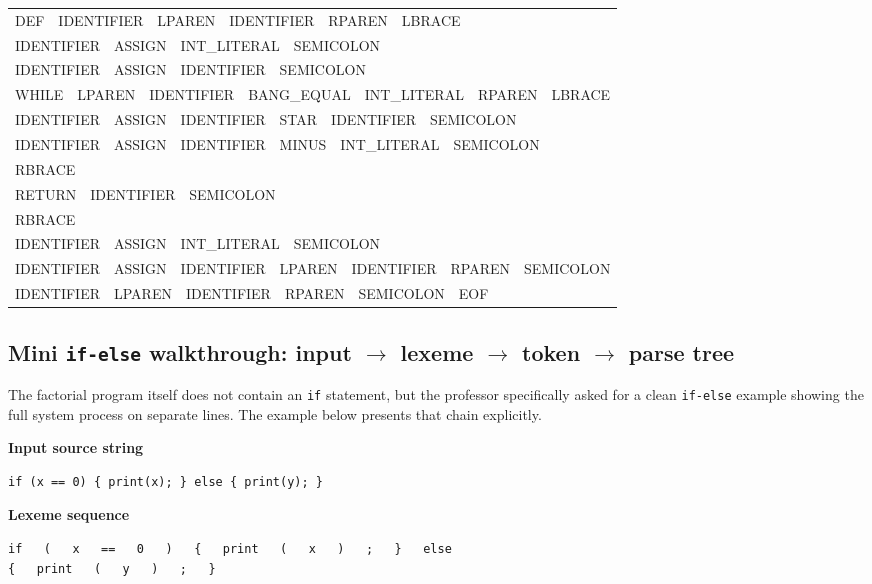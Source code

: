 \documentclass[11pt,a4paper]{article}
\begin{document}
\begin{center}
\small\ttfamily
\begin{tabular}{@{}l@{}}
  DEF\ \ IDENTIFIER\ \ LPAREN\ \ IDENTIFIER\ \ RPAREN\ \ LBRACE \\
  \quad IDENTIFIER\ \ ASSIGN\ \ INT\_LITERAL\ \ SEMICOLON \\
  \quad IDENTIFIER\ \ ASSIGN\ \ IDENTIFIER\ \ SEMICOLON \\
  \quad WHILE\ \ LPAREN\ \ IDENTIFIER\ \ BANG\_EQUAL\ \ INT\_LITERAL\ \ RPAREN\ \ LBRACE \\
  \qquad IDENTIFIER\ \ ASSIGN\ \ IDENTIFIER\ \ STAR\ \ IDENTIFIER\ \ SEMICOLON \\
  \qquad IDENTIFIER\ \ ASSIGN\ \ IDENTIFIER\ \ MINUS\ \ INT\_LITERAL\ \ SEMICOLON \\
  \quad RBRACE \\
  \quad RETURN\ \ IDENTIFIER\ \ SEMICOLON \\
  RBRACE \\
  IDENTIFIER\ \ ASSIGN\ \ INT\_LITERAL\ \ SEMICOLON \\
  IDENTIFIER\ \ ASSIGN\ \ IDENTIFIER\ \ LPAREN\ \ IDENTIFIER\ \ RPAREN\ \ SEMICOLON \\
  IDENTIFIER\ \ LPAREN\ \ IDENTIFIER\ \ RPAREN\ \ SEMICOLON\ \ EOF \\
\end{tabular}
\end{center}

\subsection*{Mini \texttt{if-else} walkthrough: input $\rightarrow$ lexeme $\rightarrow$ token $\rightarrow$ parse tree}
The factorial program itself does not contain an \texttt{if} statement, but
the professor specifically asked for a clean \texttt{if-else} example showing
the full system process on separate lines. The example below presents that
chain explicitly.

\noindent\textbf{Input source string}
\begin{lstlisting}[language={},numbers=none,frame=single,backgroundcolor=\color{codebg}]
if (x == 0) { print(x); } else { print(y); }
\end{lstlisting}

\noindent\textbf{Lexeme sequence}
\begin{lstlisting}[language={},numbers=none,frame=single,backgroundcolor=\color{codebg}]
if   (   x   ==   0   )   {   print   (   x   )   ;   }   else
{   print   (   y   )   ;   }
\end{lstlisting}
\end{document}
